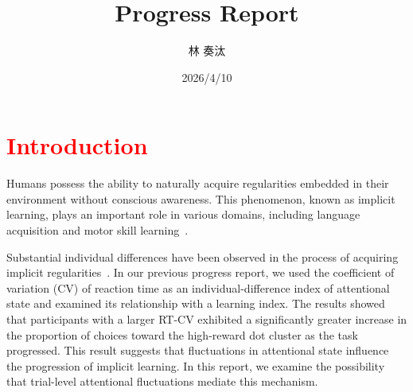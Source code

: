 \documentclass[dvipdfmx]{article}
\title{Progress Report}
\author{林 奏汰}
\date{2026/4/10}
\begin{document}
\maketitle



\section{\textcolor{red}{Introduction}}
Humans possess the ability to naturally acquire regularities embedded in their environment without conscious awareness.
This phenomenon, known as implicit learning, plays an important role in various domains, including language acquisition and motor skill learning~\cite{cleeremans1998implicit,frensch2003implicit,maresch2021measures,costea2023implicit}.

Substantial individual differences have been observed in the process of acquiring implicit regularities~\cite{kalra2019evidence}.
In our previous progress report, we used the coefficient of variation (CV) of reaction time as an individual-difference index of attentional state and examined its relationship with a learning index.
The results showed that participants with a larger RT-CV exhibited a significantly greater increase in the proportion of choices toward the high-reward dot cluster as the task progressed.
This result suggests that fluctuations in attentional state influence the progression of implicit learning.
In this report, we examine the possibility that trial-level attentional fluctuations mediate this mechanism.
\end{document}
